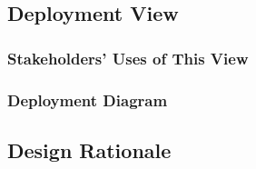\subsection{Deployment View}

\subsubsection{Stakeholders' Uses of This View}

\subsubsection{Deployment Diagram}

\subsection{Design Rationale}
